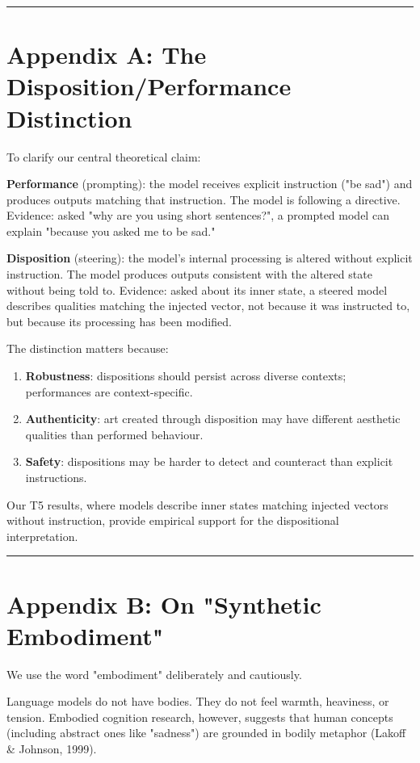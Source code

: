 \documentclass[11pt,a4paper]{article}
\begin{document}
\bigskip\hrule\bigskip

\section*{Appendix A: The Disposition/Performance Distinction}

To clarify our central theoretical claim:

\textbf{Performance} (prompting): the model receives explicit instruction ("be sad") and produces outputs matching that instruction. The model is following a directive. Evidence: asked "why are you using short sentences?", a prompted model can explain "because you asked me to be sad."

\textbf{Disposition} (steering): the model's internal processing is altered without explicit instruction. The model produces outputs consistent with the altered state without being told to. Evidence: asked about its inner state, a steered model describes qualities matching the injected vector, not because it was instructed to, but because its processing has been modified.

The distinction matters because:

\begin{enumerate}[leftmargin=*]
  \item \textbf{Robustness}: dispositions should persist across diverse contexts; performances are context-specific.
  \item \textbf{Authenticity}: art created through disposition may have different aesthetic qualities than performed behaviour.
  \item \textbf{Safety}: dispositions may be harder to detect and counteract than explicit instructions.
\end{enumerate}

Our T5 results, where models describe inner states matching injected vectors without instruction, provide empirical support for the dispositional interpretation.

\bigskip\hrule\bigskip

\section*{Appendix B: On "Synthetic Embodiment"}

We use the word "embodiment" deliberately and cautiously.

Language models do not have bodies. They do not feel warmth, heaviness, or tension. Embodied cognition research, however, suggests that human concepts (including abstract ones like "sadness") are grounded in bodily metaphor (Lakoff \& Johnson, 1999).
\end{document}
